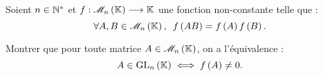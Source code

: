 \begin{corr}
\end{corr}

\begin{exo}
Soient \(n\in\mathbb{N}^*\) et \(f:\M{n}\to\K\) une fonction non-constante telle que : \[\quantifs{\forall A,B\in\M{n}}f\paren{AB}=f\paren{A}f\paren{B}.\]

Montrer que pour toute matrice \(A\in\M{n}\), on a l'équivalence : \[A\in\GL{n}\ssi f\paren{A}\not=0.\]
\end{exo}

\begin{corr}
\end{corr}